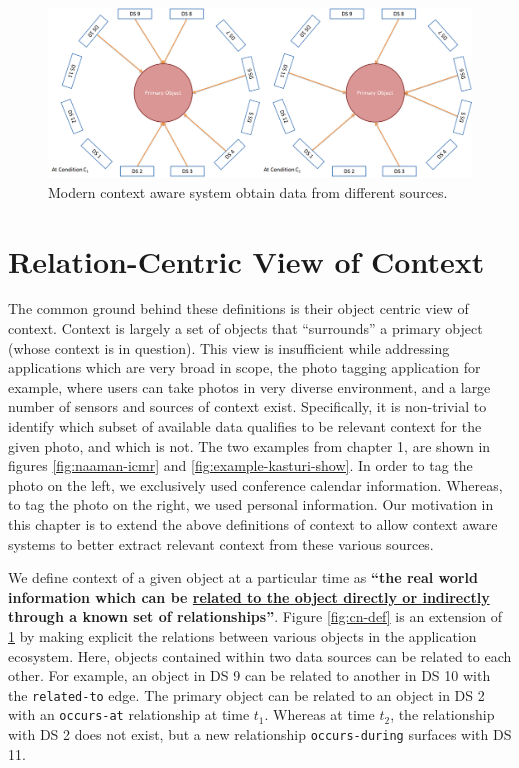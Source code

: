 \begin{figure}[t]
\centering
\includegraphics[width=\textwidth]{media/chapter2/va.png}
\caption{Modern context aware system obtain data from different sources.}
\label{fig:va-def}
\end{figure}

\section{Relation-Centric View of Context}

The common ground behind these definitions is their object centric view of context. Context is largely a set of objects that ``surrounds'' a primary object (whose context is in question). This view is insufficient while addressing applications which are very broad in scope, the photo tagging application for example, where users can take photos in very diverse environment, and a large number of sensors and sources of context exist. Specifically, it is non-trivial to identify which subset of available data qualifies to be relevant context for the given photo, and which is not. The two examples from chapter 1, are shown in figures \ref{fig:naaman-icmr} and \ref{fig:example-kasturi-show}. In order to tag the photo on the left, we exclusively used conference calendar information. Whereas, to tag the photo on the right, we used personal information. Our motivation in this chapter is to extend the above definitions of context to allow context aware systems to better extract relevant context from these various sources.

We define context of a given object at a particular time as \textbf{``the real world information which can be \uline{related to the object directly or indirectly} through a known set of relationships''}. Figure \ref{fig:cn-def} is an extension of \ref{fig:va-def} by making explicit the relations between various objects in the application ecosystem. Here, objects contained within two data sources can be related to each other. For example, an object in DS 9 can be related to another in DS 10 with the \texttt{related-to} edge. The primary object can be related to an object in DS 2 with an \texttt{occurs-at} relationship at time $t_1$. Whereas at time $t_2$, the relationship with DS 2 does not exist, but a new relationship \texttt{occurs-during} surfaces with DS 11.

